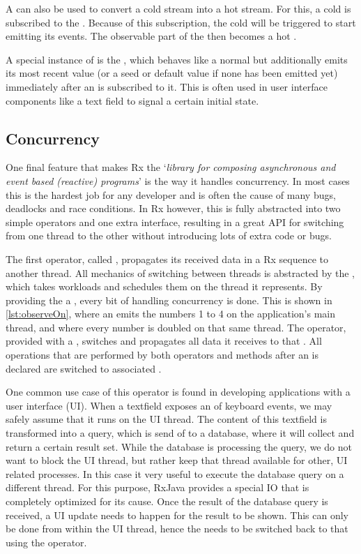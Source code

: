 A \subj can also be used to convert a cold stream into a hot stream. For this, a cold \obs is subscribed to the \subj. Because of this subscription, the cold \obs will be triggered to start emitting its events. The observable part of the \subj then becomes a hot \obs.

A special instance of \subj is the \bsubj, which behaves like a normal \subj but additionally emits its most recent value (or a seed or default value if none has been emitted yet) immediately after an \obv is subscribed to it. This is often used in user interface components like a text field to signal a certain initial state.

\subsection{Concurrency}
One final feature that makes Rx the `\textit{library for composing asynchronous and event based (reactive) programs}' is the way it handles concurrency. In most cases this is the hardest job for any developer and is often the cause of many bugs, deadlocks and race conditions. In Rx however, this is fully abstracted into two simple operators and one extra interface, resulting in a great API for switching from one thread to the other without introducing lots of extra code or bugs.

The first operator, called , propagates its received data in a Rx sequence to another thread. All mechanics of switching between threads is abstracted by the \sch, which takes workloads and schedules them on the thread it represents. By providing the  a \sch, every bit of handling concurrency is done. This is shown in \autoref{lst:observeOn}, where an \obs emits the numbers 1 to 4 on the application's main thread, and where every number is doubled on that same thread. The  operator, provided with a , switches and propagates all data it receives to that \sch. All operations that are performed by both operators and  methods after an  is declared are switched to associated \sch.

One common use case of this operator is found in developing applications with a user interface (UI). When a textfield exposes an \obs of keyboard events, we may safely assume that it runs on the UI thread. The content of this textfield is transformed into a query, which is send of to a database, where it will collect and return a certain result set. While the database is processing the query, we do not want to block the UI thread, but rather keep that thread available for other, UI related processes. In this case it very useful to execute the database query on a different thread. For this purpose, RxJava provides a special IO \sch that is completely optimized for its cause. Once the result of the database query is received, a UI update needs to happen for the result to be shown. This can only be done from within the UI thread, hence the \obs needs to be switched back to that \sch using the  operator.

